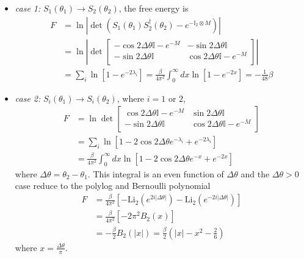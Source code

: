 \begin{itemize}
\item {\it case 1: }$S_1( \theta_1 ) \rightarrow S_2 ( \theta_2 ) $, the free energy is
\begin{equation}
\begin{aligned}
F & = \ln |\det ( S_1( \theta_1 )  S_2^{\dagger}( \theta_2 )  - e^{- \mathbb{I}_2 \otimes M} )| \\
  & = \ln \left| \det
\begin{bmatrix}
-\cos 2 \Delta \theta \mathbb{I} - e^{-M}   & -\sin 2 \Delta \theta \mathbb{I}\\
- \sin 2\Delta \theta \mathbb{I}  &   \cos 2 \Delta \theta \mathbb{I} - e^{-M} \\ 
\end{bmatrix} \right| \\
& = \sum_i \ln [ 1 -  e^{- 2 \lambda_i }  ] = \frac{\beta}{4\pi^2} \int_0^{\infty} dx \ln [ 1 - e^{-2x} ]  = - \frac{1}{48 }\beta 
\end{aligned}
\end{equation}
\item {\it case 2:} $S_i( \theta_1 ) \rightarrow S_i( \theta_2 )$, where $i = 1 $ or $ 2$, 
\begin{equation}
\begin{aligned}
F & = \ln \det 
\begin{bmatrix}
\cos 2 \Delta \theta \mathbb{I} - e^{-M}   & \sin 2 \Delta \theta \mathbb{I}\\
- \sin 2\Delta \theta \mathbb{I}  &   \cos 2 \Delta \theta \mathbb{I} - e^{-M} \\ 
\end{bmatrix} \\
& = \sum_i \ln [ 1 - 2 \cos 2 \Delta \theta e^{- \lambda_i } + e^{- 2 \lambda_i }  ] \\
& = \frac{\beta}{4\pi^2} \int_0^{\infty} dx \ln [ 1 - 2 \cos 2 \Delta \theta e^{-x} + e^{-2x} ] 
\end{aligned}
\end{equation}
where $\Delta \theta = \theta_2 - \theta_1$. This integral is an even function of $\Delta \theta$ and the $\Delta \theta > 0$ case reduce to the polylog and Bernoulli polynomial
\begin{equation}
\begin{aligned}
  F &= \frac{\beta}{4\pi^2} \left[ - \text{Li}_2 ( e^{2i |\Delta \theta|} ) - \text{Li}_2 ( e^{- 2i |\Delta \theta|} ) \right] \\
  & = \frac{\beta}{4\pi^2}  \left[ - 2\pi^2 B_2 (x) \right] \\
  &= - \frac{\beta}{2} B_2( |x| )  = \frac{\beta}{2} (| x| - x^2 - \frac{2}{6} )
\end{aligned}
\end{equation}
where $x = \frac{\Delta \theta}{ \pi}$. 
\end{itemize}




